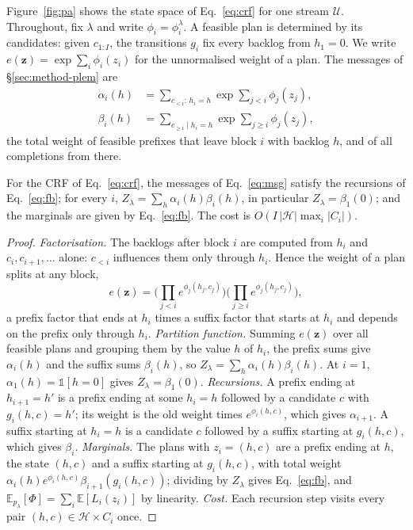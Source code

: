 

Figure~\ref{fig:pa} shows the state space of Eq.~\eqref{eq:crf} for one stream $\mathcal{U}$. Throughout, fix
$\lambda$ and write $\phi_i=\phi^\lambda_i$. A feasible plan is determined by its candidates: given $c_{1:I}$, the
transitions $g_i$ fix every backlog from $h_1=0$. We write $e(\bm{z})=\exp\sum_i\phi_i(z_i)$ for the unnormalised
weight of a plan. The messages of \S\ref{sec:method-plem} are
\begin{equation}
\begin{aligned}
\alpha_i(h)&=\textstyle\sum_{c_{<i}:\,h_i=h}\exp\sum_{j<i}\phi_j(z_j),\\
\beta_i(h)&=\textstyle\sum_{c_{\ge i}\mid h_i=h}\exp\sum_{j\ge i}\phi_j(z_j),
\end{aligned}
\label{eq:msg}
\end{equation}
the total weight of feasible prefixes that leave block $i$ with backlog $h$, and of all completions from there.

\begin{proposition}
\label{prop:fb}
For the CRF of Eq.~\eqref{eq:crf}, the messages of Eq.~\eqref{eq:msg} satisfy the recursions of Eq.~\eqref{eq:fb};
for every $i$, $Z_\lambda=\sum_h\alpha_i(h)\beta_i(h)$, in particular $Z_\lambda=\beta_1(0)$; and the marginals are given
by Eq.~\eqref{eq:fb}. The cost is $O(I\,|\mathcal{H}|\max_i|C_i|)$.
\end{proposition}

\begin{proof}
\emph{Factorisation.} The backlogs after block $i$ are computed from $h_i$ and $c_i,c_{i+1},\dots$ alone: $c_{<i}$
influences them only through $h_i$. Hence the weight of a plan splits at any block,
\[
e(\bm{z})=\Big(\textstyle\prod_{j<i}e^{\phi_j(h_j,c_j)}\Big)\Big(\textstyle\prod_{j\ge i}e^{\phi_j(h_j,c_j)}\Big),
\]
a prefix factor that ends at $h_i$ times a suffix factor that starts at $h_i$ and depends on the prefix only through
$h_i$.
\emph{Partition function.} Summing $e(\bm{z})$ over all feasible plans and grouping them by the value $h$ of $h_i$, the
prefix sums give $\alpha_i(h)$ and the suffix sums $\beta_i(h)$, so $Z_\lambda=\sum_h\alpha_i(h)\beta_i(h)$. At $i=1$,
$\alpha_1(h)=\mathds{1}[h=0]$ gives $Z_\lambda=\beta_1(0)$.
\emph{Recursions.} A prefix ending at $h_{i+1}=h'$ is a prefix ending at some $h_i=h$ followed by a candidate $c$ with
$g_i(h,c)=h'$; its weight is the old weight times $e^{\phi_i(h,c)}$, which gives $\alpha_{i+1}$. A suffix starting at
$h_i=h$ is a candidate $c$ followed by a suffix starting at $g_i(h,c)$, which gives $\beta_i$.
\emph{Marginals.} The plans with $z_i=(h,c)$ are a prefix ending at $h$, the state $(h,c)$ and a suffix starting at
$g_i(h,c)$, with total weight $\alpha_i(h)e^{\phi_i(h,c)}\beta_{i+1}(g_i(h,c))$; dividing by $Z_\lambda$ gives
Eq.~\eqref{eq:fb}, and $\mathbb{E}_{p_\lambda}[\Phi]=\sum_i\mathbb{E}[L_i(z_i)]$ by linearity.
\emph{Cost.} Each recursion step visits every pair $(h,c)\in\mathcal{H}\times C_i$ once.
\end{proof}

